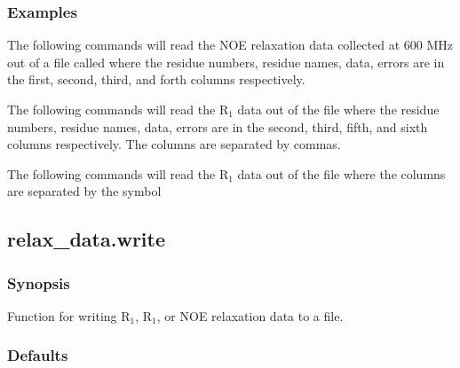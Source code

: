 \subsubsection{Examples}

The following commands will read  the NOE relaxation  data collected at 600 MHz out of a file
called 
 where the residue numbers, residue names, data, errors are in the
first, second, third, and forth columns respectively.





The following commands will read  the R$_1$ data out of the file 
 where the residue
numbers, residue names, data, errors are in the second, third, fifth, and sixth columns
respectively.  The columns are separated by commas.





The following commands will read  the R$_1$ data out of the file 
 where the columns are
separated by the symbol 




\newpage

\subsection{relax\_data.write}


\subsubsection{Synopsis}

Function for writing R$_1$, R$_1$, or NOE relaxation data to a file.

\subsubsection{Defaults}

